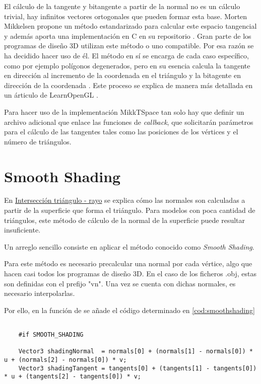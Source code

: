 El cálculo de la tangente y bitangente a partir de la normal no es un cálculo trivial, hay infinitos vectores ortogonales que pueden formar esta base. Morten Mikkelsen \cite{mikkelsen2008simulation} propone un método estandarizado para calcular este espacio tangencial y además aporta una implementación en C en su repositorio \cite{mikktspace}. Gran parte de los programas de diseño 3D utilizan este método o uno compatible. Por esa razón se ha decidido hacer uso de él. El método en sí se encarga de cada caso específico, como por ejemplo polígonos degenerados, pero en su esencia calcula la tangente en dirección al incremento de la coordenada  en el triángulo y la bitagente en dirección de la coordenada . Este proceso se explica de manera más detallada en un árticulo de LearnOpenGL \cite{learnopengl}.

Para hacer uso de la implementación MikkTSpace tan solo hay que definir un archivo adicional que enlace las funciones de \emph{callback}, que solicitarán parámetros para el cálculo de las tangentes tales como las posiciones de los vértices y el número de triángulos.

	
\section{Smooth Shading}
	
En \hyperref[subsec:triintersection]{Intersección triángulo - rayo} se explica cómo las normales son calculadas a partir de la superficie que forma el triángulo. Para modelos con poca cantidad de triángulos, este método de cálculo de la normal de la superficie puede resultar insuficiente.
	
Un arreglo sencillo consiste en aplicar el método conocido como \emph{Smooth Shading}. 
	
Para este método es necesario precalcular una normal por cada vértice, algo que hacen casi todos los programas de diseño 3D. En el caso de los ficheros .obj, estas son definidas con el prefijo "vn". Una vez se cuenta con dichas normales, es necesario interpolarlas. 

Por ello, en la función  de  se añade el código determinado en \autoref{cod:smoothshading}

\begin{minipage}[c]{0.95\textwidth}
\begin{lstlisting}[label={cod:smoothshading}, caption={Código interpolación de normales.}]
			
	#if SMOOTH_SHADING 

    Vector3 shadingNormal  = normals[0] + (normals[1] - normals[0]) * u + (normals[2] - normals[0]) * v;
    Vector3 shadingTangent = tangents[0] + (tangents[1] - tangents[0]) * u + (tangents[2] - tangents[0]) * v;

\end{lstlisting}
\end{minipage}
	
